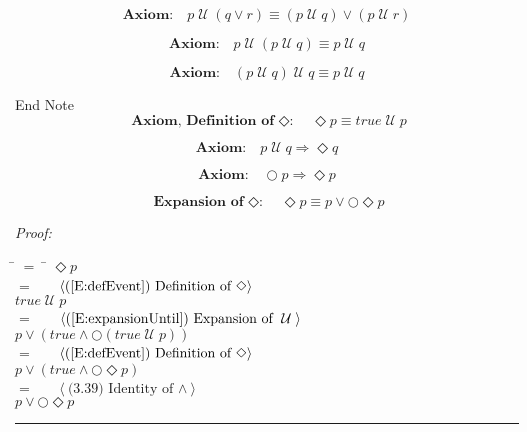 \documentclass[fleqn, leqno]{article}
\newcommand{\lgap}{2pt}                             %
\newcommand{\mymathindent}{24pt}                      %
\newcommand{\myqed}{\hfill\rule[-.23ex]{1.2ex}{2.0ex}}
\newcommand{\until}{\;\mathcal{U}\;}
\newcommand{\Gll} {\langle}                         %
\newcommand{\Ggg} {\rangle}                         %
\newcommand{\Hint}[1]     {\ \ \ $\Gll              \mbox{#1} \Ggg$ }   %
\begin{document}
\begin{equation}\label{E:untilOrEquiv}
\textbf{Axiom:}\quad p \until (q \lor r) \equiv (p \until q) \lor (p \until r)
\end{equation}

\begin{equation}\label{E:untilIdem}
\textbf{Axiom:}\quad p \until (p \until q) \equiv p \until q
\end{equation}

\begin{equation}\label{E:untilIdemR}
\textbf{Axiom:}\quad (p \until q) \until q \equiv p \until q
\end{equation}

End Note\\

\begin{equation}\label{E:defEvent}
\textbf{Axiom, Definition of $\Diamond$:}\quad \Diamond p \equiv true \until p
\end{equation}

\begin{equation}\label{E:untilImpEvent}
\textbf{Axiom:}\quad p \until q \Rightarrow \Diamond q
\end{equation}

\begin{equation}\label{E:nextEvent}
\textbf{Axiom:}\quad \bigcirc p \Rightarrow \Diamond p
\end{equation}


\begin{equation}\label{E:expansionEvent}
\textbf{Expansion of $\Diamond$:}\quad \Diamond p \equiv p \lor \bigcirc\Diamond p
\end{equation}

\emph{Proof:}
\begin{tabbing}
\hspace{\mymathindent} \= $= \;$ \= \kill
  \> \>   $\Diamond p$\\[\lgap]
  \> $=$  \>  \Hint{(\ref{E:defEvent}) Definition of $\Diamond$}\\[\lgap]
  \> \>   $true \until p$\\[\lgap]
  \> $=$  \>  \Hint{(\ref{E:expansionUntil}) Expansion of $\until$}\\[\lgap]
  \> \>   $p \lor (true \land \bigcirc(true \until p))$\\[\lgap]
  \> $=$  \>  \Hint{(\ref{E:defEvent}) Definition of $\Diamond$}\\[\lgap]
  \> \>   $p \lor (true \land \bigcirc\Diamond p)$\\[\lgap]
  \> $=$  \>  \Hint{(3.39) Identity of $\land$}\\[\lgap]
  \> \>   $p \lor \bigcirc\Diamond p$\\[\lgap]
\end{tabbing}
\myqed\\[\lgap]
\end{document}
